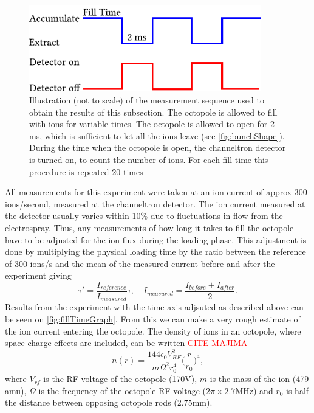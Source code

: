 \begin{figure}
    \centering
    \includegraphics[width = 0.9\textwidth]{main/StoragePulse.pdf}
    \caption{Illustration (not to scale) of the measurement sequence used to obtain the results of this subsection. The octopole is allowed to fill with ions for variable times. The octopole is allowed to open for 2 ms, which is sufficient to let all the ions leave (see \cref{fig:bunchShape}). During the time when the octopole is open,
    the channeltron detector is turned on, to count the number of ions. For each fill time this procedure is repeated 20 times}
    \label{fig:storageSequence}
\end{figure}
All measurements for this experiment were taken at an ion current of approx 300 ions/second, measured at the channeltron detector.
The ion current measured at the detector usually varies within 10\% due to fluctuations in flow from the electrospray. Thus, any measurements of how long it takes to fill the octopole have to be adjusted for the ion flux during the loading phase.  This adjustment is done by multiplying the physical loading time by the ratio between the reference of 300 ions/s and the mean of the measured current before and after the experiment giving
\begin{equation}
    \tau'= \frac{I_{reference}}{I_{measured}}\tau,\quad I_{measured} = \frac{I_{before}+I_{after}}{2}.
\end{equation}
Results from the experiment with the time-axis adjsuted as described above can be seen on \cref{fig:fillTimeGraph}. From this we can make a very rough estimate of the ion current entering the octopole.
The density of ions in an octopole, where space-charge effects are included, can be written \textcolor{red}{CITE MAJIMA}
\begin{equation}
    n(r) = \frac{144\epsilon_0 V_{RF}^2}{m\Omega^2r_0^4}\bigg(\frac{r}{r_0}\bigg)^4,
\end{equation}
where $V_{rf}$ is the RF voltage of the octopole (170V), $m$ is the mass of the ion (479 amu), $\Omega$ is the frequency of the octopole RF voltage ($2\pi\times2.7$MHz) and $r_0$ is half the distance between opposing octopole rods (2.75mm).


